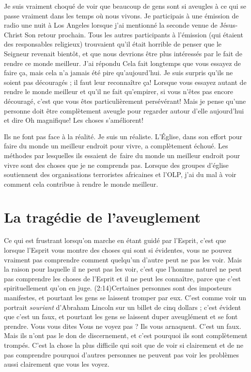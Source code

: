 Je suis vraiment choqué de voir que beaucoup de gens sont si aveugles à ce qui se passe
 vraiment dans les temps où nous vivons. Je participais à une émission de radio
 une nuit à Los Angeles lorsque j'ai mentionné la seconde venue
 de Jésus-Christ \ocadr Son retour prochain.
 Tous les autres participants à l'émission
 (qui étaient des responsables religieux) trouvaient qu'il était horrible
 de penser que le Seigneur revenait bientôt, et que nous devrions être plus
 intéressés par le fait de rendre ce monde meilleur. J'ai répondu\frcolon{}
 \Og Cela fait longtemps que vous essayez de faire ça, mais cela n'a jamais
 été pire qu'aujourd'hui. \Fg{}
 Je suis surpris qu'ils ne soient pas découragés ;
 il faut leur reconnaître ça!
 Lorsque vous essayez autant de rendre le monde meilleur et qu'il ne fait
 qu'empirer, si vous n'êtes pas encore découragé, c'est que vous êtes
 particulièrement persévérant!
 Mais je pense qu'une personne doit être complètement aveugle pour regarder
 autour d'elle aujourd'hui et dire\frcolon{}
 \Og Oh magnifique! Les choses s'améliorent! \Fg{}

Ils ne font pas face à la réalité. Je suis un réaliste.
 L'Église, dans son effort pour faire du monde un meilleur endroit
 pour vivre, a complètement échoué.
 Les méthodes par lesquelles ils essaient de~faire du monde un meilleur
 endroit pour vivre sont des choses que je ne comprends pas.
 Lorsque des groupes d'église soutiennent des organisations terroristes
 africaines et l'OLP,
 j'ai du mal à voir comment cela contribue à rendre le monde meilleur.

\section{La trag\'edie de l'aveuglement}

Ce qui est frustrant lorsqu'on marche en étant guidé par l'Esprit,
 c'est que lorsque l'Esprit vous montre des choses qui sont si évidentes,
 vous ne pouvez vraiment pas comprendre comment quelqu'un d'autre
 peut ne pas les voir. Mais la raison pour laquelle il ne peut pas les voir,
 c'est que l'homme naturel ne peut pas comprendre les choses de l'Esprit\frcolon{}
 \Og [\dots{}] et il ne peut les connaître, parce que c'est spirituellement
 qu'on en juge. \Fg{}
 (2:14)Certaines personnes sont des imposteurs manifestes,
 et pourtant les gens se laissent tromper par eux.
 C'est comme voir un portrait \emph{souriant} d'Abraham Lincoln
 sur un billet de cinq dollars ; c'est évident que c'est un faux,
 et pourtant les gens se laissent duper aveuglément et se font prendre.
 Vous vous dites\frcolon{} \Og Vous ne voyez pas ? Ils vous arnaquent.
 C'est un faux. \Fg{}
 Mais ils n'ont pas le don de discernement, et c'est pourquoi ils sont
 complètement trompés.
 C'est la chose la plus difficile qui soit que de voir si clairement
 et de ne pas comprendre pourquoi d'autres personnes ne peuvent
 pas voir les problèmes aussi clairement que vous les voyez.

